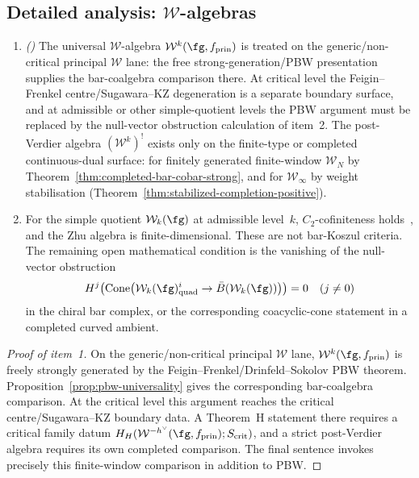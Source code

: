\subsection{Detailed analysis: $\mathcal{W}$-algebras}

\begin{proposition}\label{prop:w-algebra-koszul}
\begin{enumerate}
\item\emph{(\ClaimStatusConditional)}
The universal $\mathcal{W}$-algebra $\mathcal{W}^k(\fg, f_{\mathrm{prin}})$
is treated on the generic/non-critical principal $\mathcal W$ lane: the
free strong-generation/PBW presentation supplies the bar-coalgebra
comparison there. At critical level the Feigin--Frenkel
centre/Sugawara--KZ degeneration is a separate boundary surface, and at
admissible or other simple-quotient levels the PBW argument must be
replaced by the null-vector obstruction calculation of item~\textup{2}.
The post-Verdier algebra
$(\mathcal{W}^k)^!$ exists only on the finite-type or completed
continuous-dual surface: for finitely generated finite-window
$\mathcal{W}_N$ by Theorem~\textup{\ref{thm:completed-bar-cobar-strong}},
and for $\mathcal{W}_\infty$ by weight stabilisation
\textup{(}Theorem~\textup{\ref{thm:stabilized-completion-positive}}\textup{)}.

\item For the simple quotient $\mathcal{W}_k(\fg)$ at admissible
level~$k$, $C_2$-cofiniteness holds~\cite{Arakawa15}, and the Zhu
algebra is finite-dimensional. These are not bar-Koszul criteria. The
remaining open mathematical condition is the vanishing of the null-vector
obstruction
\[
H^j\!\left(
\operatorname{Cone}\bigl(
\mathcal W_k(\fg)^i_{\mathrm{quad}}\to \bar B(\mathcal W_k(\fg))
\bigr)\right)=0
\quad(j\ne0)
\]
in the chiral bar complex, or the corresponding coacyclic-cone
statement in a completed curved ambient.
\end{enumerate}
\end{proposition}

\begin{proof}[Proof of item~\textup{1}]
On the generic/non-critical principal $\mathcal W$ lane,
$\mathcal{W}^k(\fg, f_{\mathrm{prin}})$ is freely strongly generated
by the Feigin--Frenkel/Drinfeld--Sokolov PBW theorem.
Proposition~\ref{prop:pbw-universality} gives the corresponding
bar-coalgebra comparison.  At the critical level this argument reaches
the critical centre/Sugawara--KZ boundary data.  A Theorem~H statement
there requires a critical family datum
$H_H(\mathcal W^{-h^\vee}(\fg,f_{\mathrm{prin}});
S_{\mathrm{crit}})$, and a strict post-Verdier algebra requires its
own completed comparison.  The final sentence invokes precisely this
finite-window comparison in addition to PBW.
\end{proof}

